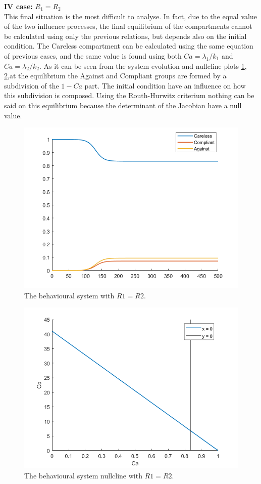 \textbf{IV case:} $R_1 = R_2$ \\
This final situation is the most difficult to analyse. In fact, due to the equal value of the two influence processes, the final equilibrium of the compartments cannot be calculated using only the previous relations, but depends also on the initial condition. 
The Careless compartment can be calculated using the same equation of previous cases, and the same value is found using both $Ca = \lambda_1/k_1$ and $Ca = \lambda_2/k_2$. As it can be seen from the system evolution and nullcline plots \ref{fig:r1r2equaldyn}, \ref{fig:r1r2equalnullcline},at the equilibrium the Against and Compliant groups are formed by a subdivision of the $1 - Ca$ part. The initial condition have an influence on how this subdivision is composed. Using the Routh-Hurwitz criterium nothing can be said on this equilibrium because the determinant of the Jacobian have a null value.
\begin{figure}[h]
	\centering
	\includegraphics[width=0.7\linewidth]{figure/behavioural_equilibrium/r1equalr2_dyn}
	\caption[Behavioural fourth second case]{The behavioural system  with $R1 = R2$.}
	\label{fig:r1r2equaldyn}
\end{figure}

\begin{figure}[h]
	\centering
	\includegraphics[width=0.7\linewidth]{figure/behavioural_equilibrium/r1equalr2_nullcline}
	\caption[Behavioural nullcline fourth case]{The behavioural system nullcline with $R1 = R2$.}
	\label{fig:r1r2equalnullcline}
\end{figure}


